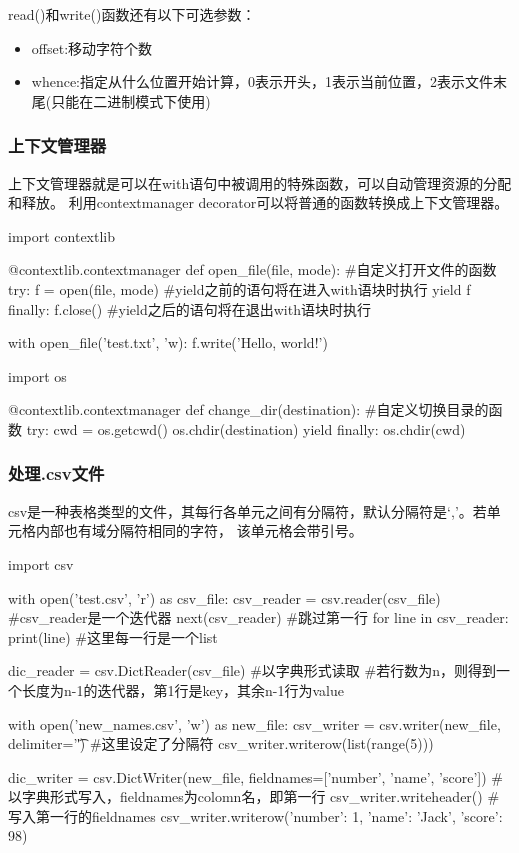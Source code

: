       read()和write()函数还有以下可选参数：
      \begin{itemize}
        \item offset:移动字符个数
        \item whence:指定从什么位置开始计算，0表示开头，1表示当前位置，2表示文件末尾(只能在二进制模式下使用)
      \end{itemize}

    \subsubsection{上下文管理器}
      上下文管理器就是可以在with语句中被调用的特殊函数，可以自动管理资源的分配和释放。
      利用contextmanager decorator可以将普通的函数转换成上下文管理器。
      \begin{codeblock}[language=python, caption={contextmanager}]
        import contextlib

        @contextlib.contextmanager
        def open_file(file, mode): #自定义打开文件的函数
            try:
                f = open(file, mode) #yield之前的语句将在进入with语块时执行
                yield f
            finally:
                f.close() #yield之后的语句将在退出with语块时执行

        with open_file('test.txt', 'w):
            f.write('Hello, world!')

        import os

        @contextlib.contextmanager
        def change_dir(destination): #自定义切换目录的函数
        try:
            cwd = os.getcwd()
            os.chdir(destination)
            yield
        finally:
            os.chdir(cwd)
      \end{codeblock}

    \subsubsection{处理.csv文件}
      csv是一种表格类型的文件，其每行各单元之间有分隔符，默认分隔符是`,'。若单元格内部也有域分隔符相同的字符，
      该单元格会带引号。
      \begin{codeblock}[language=python, caption={read and write .csv files}]
        import csv

        with open('test.csv', 'r') as csv_file:
          csv_reader = csv.reader(csv_file) #csv\_reader是一个迭代器
          next(csv_reader) #跳过第一行
          for line in csv_reader:
            print(line) #这里每一行是一个list

          dic_reader = csv.DictReader(csv_file) #以字典形式读取
          #若行数为n，则得到一个长度为n-1的迭代器，第1行是key，其余n-1行为value

        with open('new_names.csv', 'w') as new_file:
          csv_writer = csv.writer(new_file, delimiter='\t') #这里设定了分隔符
          csv_writer.writerow(list(range(5)))

          dic_writer = csv.DictWriter(new_file, fieldnames=['number', 'name', 'score'])
          #以字典形式写入，fieldnames为colomn名，即第一行
          csv_writer.writeheader() #写入第一行的fieldnames
          csv_writer.writerow({'number': 1, 'name': 'Jack', 'score': 98})
      \end{codeblock}

